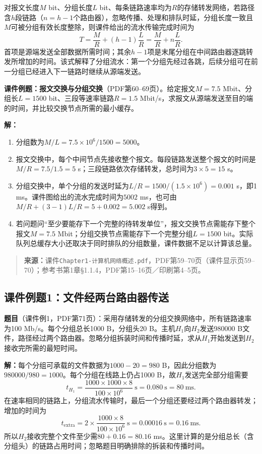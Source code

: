 对报文长度$M$ bit、分组长度$L$ bit、每条链路速率均为$R$的存储转发网络，若路径含$h$段链路（$n=h-1$个路由器），忽略传播、处理和排队时延，分组长度一致且$M$可被分组有效长度整除，则课件给出的流水传输完成时间为
\[
T=\frac{M}{R}+(h-1)\frac{L}{R}
 =\frac{M}{R}+n\frac{L}{R}.
\]
首项是源端发送全部数据所需时间；其余$h-1$项是末尾分组在中间路由器逐跳转发所增加的时间。该式解释了分组流水：第一个分组先经过各跳，后续分组可在前一分组已经进入下一链路时继续从源端发送。

\textbf{课件例题：报文交换与分组交换}（PDF第60--69页）。给定报文$M=7.5$ Mbit、分组长$L=1500$ bit、三段等速率链路$R=1.5$ Mbit/s，求报文从源端发送至目的端的时间，并比较交换节点所需的最小缓存。

\textbf{解：}
\begin{enumerate}
  \item 分组数为$M/L=7.5\times10^6/1500=5000$。
  \item 报文交换中，每个中间节点先接收整个报文。每段链路发送整个报文的时间是$M/R=7.5/1.5=5$ s；三段链路依次存储转发，总时间为$3\times5=15$ s。
  \item 分组交换中，单个分组的发送时延为$L/R=1500/(1.5\times10^6)=0.001$ s，即1 ms。课件图给出的流水完成时间为$5002$ ms，也可由$M/R+(3-1)L/R=5+0.002=5.002$ s得到。
  \item 若问题问“至少要能存下一个完整的待转发单位”，报文交换节点需能存下整个报文$M=7.5$ Mbit；分组交换节点需能存下一个完整分组$L=1500$ bit。实际队列总缓存大小还取决于同时排队的分组数量，课件数据不足以计算该总量。
\end{enumerate}
\annotationarea[4]

\begin{quote}\small\textbf{来源：}课件\texttt{Chapter1-计算机网络概述.pdf}，PDF第59--70页（课件显示页59--70）；参考书第1章§1.1.4，PDF第15--16页／印刷第4--5页。\end{quote}
\annotationarea[4]

\subsection{课件例题1：文件经两台路由器传送}

\textbf{题目}（课件例1，PDF第71页）：采用存储转发的分组交换网络中，所有链路速率为100 Mb/s。每个分组总长1000 B，分组头20 B。主机$H_1$向$H_2$发送980000 B文件，路径经过两个路由器。忽略分组拆装时间和传播时延，求从$H_1$开始发送到$H_2$接收完所需的最短时间。

\textbf{解：}每个分组可承载的文件数据为$1000-20=980$ B，因此分组数为$980000/980=1000$。每个分组在线路上仍占1000 B，故$H_1$发送完全部分组需要
\[
 t_{H_1}=\frac{1000\times1000\times8}{100\times10^6}\ \mathrm{s}
 =0.080\ \mathrm{s}=80\ \mathrm{ms}.
\]
在速率相同的链路上，分组流水传输时，最后一个分组还要经过两个路由器转发；增加的时间为
\[
 t_{\mathrm{extra}}=2\times\frac{1000\times8}{100\times10^6}\ \mathrm{s}
 =0.00016\ \mathrm{s}=0.16\ \mathrm{ms}.
\]
所以$H_2$接收完整个文件至少需$80+0.16=80.16$ ms。这里计算的是分组总长（含分组头）的链路占用时间；忽略题目明确排除的拆装和传播时间。
\annotationarea[4]


